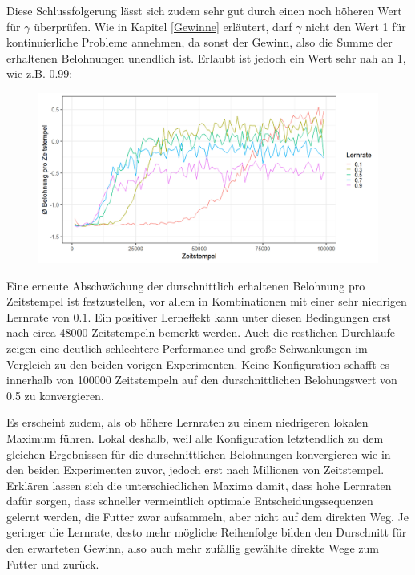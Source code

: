 \par 
Diese Schlussfolgerung lässt sich zudem sehr gut durch einen noch höheren Wert für $\gamma$ überprüfen. Wie in Kapitel \ref{Gewinne} erläutert, darf $\gamma$ nicht den Wert 1 für kontinuierliche Probleme annehmen, da sonst der Gewinn, also die Summe der erhaltenen Belohnungen unendlich ist. Erlaubt ist jedoch ein Wert sehr nah an 1, wie z.B. 0.99:
\begin{figure}[H]
    \centering
    \includegraphics[width=\textwidth]{images/antGameAnalysis099DiscA}
    \label{fig:test1}
\end{figure}
Eine erneute Abschwächung der durschnittlich erhaltenen Belohnung pro Zeitstempel ist festzustellen, vor allem in Kombinationen mit einer sehr niedrigen Lernrate von $0.1$. Ein positiver Lerneffekt kann unter diesen Bedingungen erst nach circa 48000 Zeitstempeln bemerkt werden. Auch die restlichen Durchläufe zeigen eine deutlich schlechtere Performance und große Schwankungen im Vergleich zu den beiden vorigen Experimenten. Keine Konfiguration schafft es innerhalb von 100000 Zeitstempeln auf den durschnittlichen Belohungswert von 0.5 zu konvergieren. 
\par 
Es erscheint zudem, als ob höhere Lernraten zu einem niedrigeren lokalen Maximum führen. Lokal deshalb, weil alle Konfiguration letztendlich zu dem gleichen Ergebnissen für die durschnittlichen Belohnungen konvergieren wie in den beiden Experimenten zuvor, jedoch erst nach Millionen von Zeitstempel. Erklären lassen sich die unterschiedlichen Maxima damit, dass hohe Lernraten dafür sorgen, dass schneller vermeintlich optimale Entscheidungssequenzen gelernt werden, die Futter zwar aufsammeln, aber nicht auf dem direkten Weg. Je geringer die Lernrate, desto mehr mögliche Reihenfolge bilden den Durschnitt für den erwarteten Gewinn, also auch mehr zufällig gewählte direkte Wege zum Futter und zurück.

